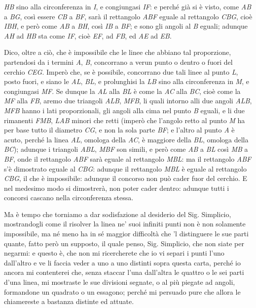 \documentclass[11pt,twoside,openany]{book}
\begin{document}
\emph{HB} sino alla circonferenza in \emph{I}, e congiungasi \emph{IF}: e perché già si è visto, come \emph{AB} a \emph{BG}, così essere \emph{CB} a \emph{BF}, sarà il rettangolo \emph{ABF} eguale al rettangolo \emph{CBG}, cioè \emph{IBH}, e però come \emph{AB} a \emph{BH}, così \emph{IB} a \emph{BF}; e sono gli angoli al \emph{B} eguali; adunque \emph{AH} ad \emph{HB} sta come \emph{IF}, cioè \emph{EF}, ad \emph{FB}, ed \emph{AE} ad \emph{EB}.

Dico, oltre a ciò, che è impossibile che le linee che abbiano tal proporzione, partendosi da i termini \emph{A}, \emph{B}, concorrano a verun punto o dentro o fuori del cerchio \emph{CEG}. Imperò che, se è possibile, concorrano due tali linee al punto \emph{L}, posto fuori, e siano le \emph{AL}, \emph{BL}, e prolunghisi la \emph{LB} sino alla circonferenza in \emph{M}, e congiungasi \emph{MF}. Se dunque la \emph{AL} alla \emph{BL} è come la \emph{AC} alla \emph{BC}, cioè come la \emph{MF} alla \emph{FB}, aremo due triangoli \emph{ALB}, \emph{MFB}, li quali intorno alli due angoli \emph{ALB}, \emph{MFB} hanno i lati proporzionali, gli angoli alla cima nel punto \emph{B} eguali, e li due rimanenti \emph{FMB}, \emph{LAB} minori che retti (imperò che l'angolo retto al punto \emph{M} ha per base tutto il diametro \emph{CG}, e non la sola parte \emph{BF}; e l'altro al punto \emph{A} è acuto, perché la linea \emph{AL}, omologa della \emph{AC}, è maggiore della \emph{BL}, omologa della \emph{BC}); adunque i triangoli \emph{ABL}, \emph{MBF} son simili, e però come \emph{AB} a \emph{BL} così \emph{MB} a \emph{BF}, onde il rettangolo \emph{ABF} sarà eguale al rettangolo \emph{MBL}: ma il rettangolo \emph{ABF} s'è dimostrato eguale al \emph{CBG}: adunque il rettangolo \emph{MBL} è eguale al rettangolo \emph{CBG}, il che è impossibile: adunque il concorso non può cader fuor del cerchio. E nel medesimo modo si dimostrerà, non poter cader dentro: adunque tutti i concorsi cascano nella circonferenza stessa.

Ma è tempo che torniamo a dar sodisfazione al desiderio del Sig. Simplicio, mostrandogli come il risolver la linea ne' suoi infiniti punti non è non solamente impossibile, ma né meno ha in sé maggior difficoltà che 'l distinguere le sue parti quante, fatto però un supposto, il quale penso, Sig. Simplicio, che non siate per negarmi: e questo è, che non mi ricercherete che io vi separi i punti l'uno dall'altro e ve li faccia veder a uno a uno distinti sopra questa carta, perché io ancora mi contenterei che, senza staccar l'una dall'altra le quattro o le sei parti d'una linea, mi mostraste le sue divisioni segnate, o al più piegate ad angoli, formandone un quadrato o un essagono; perché mi persuado pure che allora le chiamereste a bastanza distinte ed attuate.
\end{document}
